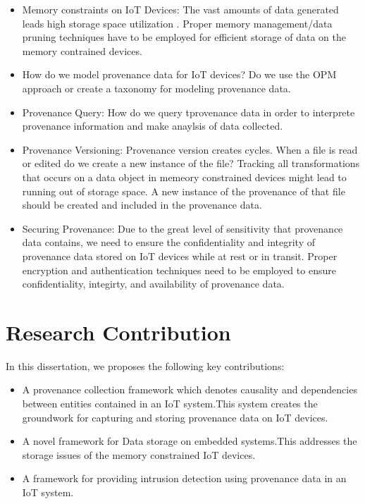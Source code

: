 \begin{itemize}

\item Memory constraints on IoT Devices: The vast amounts of data generated leads high storage space utilization . Proper memory management/data pruning techniques have to be employed for efficient storage of data on the memory contrained devices. 

\item How do we model provenance data for IoT devices? Do we use the OPM approach or create a taxonomy for modeling provenance data.

\item Provenance Query: How do we query tprovenance data in order to interprete provenance information and make anaylsis of data collected.

\item Provenance Versioning: Provenance version creates cycles. When a file is read or edited do we create a new instance of the file? Tracking all transformations that occurs on a data object in memeory constrained devices might lead to running out of storage space. A new instance of the provenance of that file should be created and included in the provenance data.

\item Securing Provenance: Due to the great level of sensitivity that  provenance data contains, we need to ensure the confidentiality and integrity of provenance data stored on IoT devices while at rest or in transit. Proper encryption and authentication techniques need to be employed to ensure confidentiality, integirty, and availability of provenance data.
\end{itemize}

\section{Research Contribution}

In this dissertation, we proposes the following key contributions:

\begin{itemize}
  \item A provenance collection framework which denotes causality and dependencies between entities contained in an IoT system.This system creates the groundwork for capturing and storing provenance data  on IoT devices.
  \item A novel framework for Data storage on embedded systems.This addresses the storage issues of the memory constrained IoT devices.
   \item A framework for providing intrusion detection using provenance data in an IoT system.
\end{itemize}

